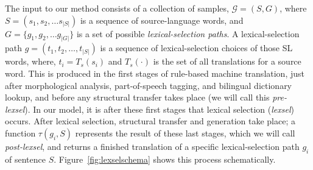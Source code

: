 \documentclass[11pt]{article}
\begin{document}
The input to our method consists of a collection of samples,
$\mathcal{G} = (S, G)$, where $S = (s_1, s_2, \ldots s_{|S|})$ is a
sequence of source-language words, and $G = \{g_1, g_2, \ldots
g_{|G|}\}$ is a set of possible \emph{lexical-selection paths}. A
lexical-selection path $g = (t_1, t_2, \ldots, t_{|S|})$ is a sequence
of lexical-selection choices of those SL words, where, \(t_i=T_s(s_i)\)
and \(T_s(\cdot)\)  is the set of all translations for a source
word. This is produced in the first stages of rule-based machine
translation, just after morphological analysis, part-of-speech
tagging, and bilingual dictionary lookup, and before any structural
transfer takes place (we will call this \emph{pre-lexsel}). In our
model, it is after these first stages that lexical selection
(\emph{lexsel}) occurs. After lexical selection, structural transfer
and generation take place; a function $\tau(g_i,S)$ represents the
result of these last stages, which we will call \emph{post-lexsel},
and returns a finished translation of a specific lexical-selection
path $g_i$ of sentence $S$. Figure~\ref{fig:lexselschema} shows
 this process schematically. %

\end{document}
